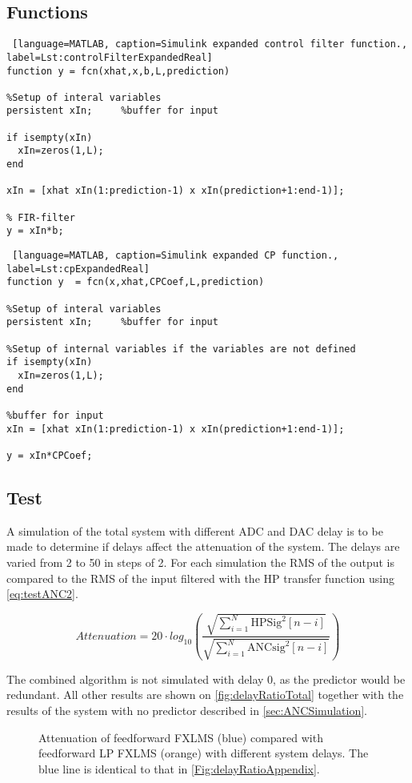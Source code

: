 \subsection{Functions}

\begin{lstlisting} [language=MATLAB, caption=Simulink expanded control filter function., label=Lst:controlFilterExpandedReal]
function y = fcn(xhat,x,b,L,prediction)

%Setup of interal variables
persistent xIn;     %buffer for input

if isempty(xIn)
  xIn=zeros(1,L);
end

xIn = [xhat xIn(1:prediction-1) x xIn(prediction+1:end-1)];

% FIR-filter
y = xIn*b;
\end{lstlisting}

\begin{lstlisting} [language=MATLAB, caption=Simulink expanded CP function., label=Lst:cpExpandedReal]
function y  = fcn(x,xhat,CPCoef,L,prediction)

%Setup of interal variables
persistent xIn;     %buffer for input

%Setup of internal variables if the variables are not defined
if isempty(xIn)
  xIn=zeros(1,L);
end

%buffer for input
xIn = [xhat xIn(1:prediction-1) x xIn(prediction+1:end-1)];

y = xIn*CPCoef;
\end{lstlisting}

\subsection{Test}
A simulation of the total system with different ADC and DAC delay is to be made to determine if delays affect the attenuation of the system. The delays are varied from 2 to 50 in steps of 2. For each simulation the RMS of the output is compared to the RMS of the input filtered with the HP transfer function using \autoref{eq:testANC2}. 

\begin{equation}\label{eq:testANC2}
	Attenuation=20 \cdot log_{10} \left (\frac{\sqrt{\sum\limits_{i=1}^{N}\mathrm{HPSig}^2[n-i]}}{\sqrt{\sum\limits_{i=1}^{N}\mathrm{ANCsig}^2[n-i]}}  \right )
\end{equation}

The combined algorithm is not simulated with delay 0, as the predictor would be redundant. All other results are shown on \autoref{fig:delayRatioTotal} together with the results of the system with no predictor described in \autoref{sec:ANCSimulation}.
\begin{figure}[H]
	\centering
	\caption{ Attenuation of feedforward FXLMS (blue) compared with feedforward LP FXLMS (orange) with different system delays. The blue line is identical to that in \autoref{Fig:delayRatioAppendix}.}
		\label{fig:delayRatioTotal}
\end{figure}

